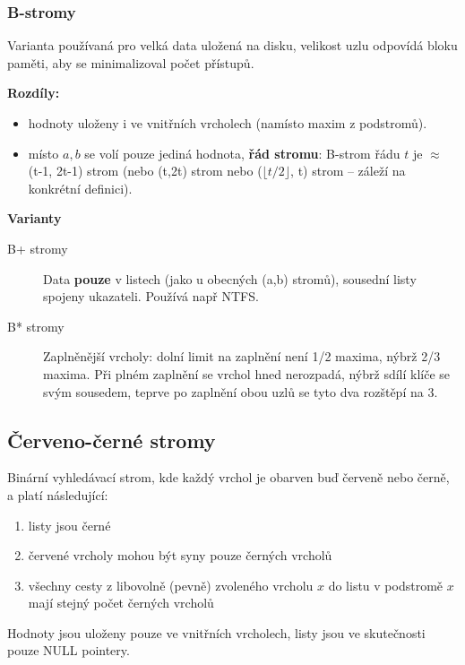 \documentclass[11pt]{report} %
\numberwithin{equation}{section}
\begin{document}
\subsubsection{B-stromy}
Varianta používaná pro velká data uložená na disku, velikost uzlu odpovídá bloku paměti, aby se minimalizoval počet přístupů.

\textbf{Rozdíly: }
\begin{itemize}
	
	
	\item hodnoty uloženy i ve vnitřních vrcholech (namísto maxim z podstromů). 
	\item místo $a,b$ se volí pouze jediná hodnota, \textbf{řád stromu}: B-strom řádu $t$ je $\approx$ (t-1, 2t-1) strom (nebo (t,2t) strom nebo ($\lfloor t/2\rfloor$, t) strom -- záleží na konkrétní definici).
\end{itemize}

\textbf{Varianty}
\begin{description}
	
	
	\item[B+ stromy] Data \textbf{pouze} v listech (jako u obecných (a,b) stromů), sousední listy spojeny ukazateli. Používá např NTFS.
	
	\item[B* stromy] Zaplněnější vrcholy: dolní limit na zaplnění není 1/2 maxima, nýbrž 2/3 maxima. Při plném zaplnění se vrchol hned nerozpadá, nýbrž sdílí klíče se svým sousedem, teprve po zaplnění obou uzlů se tyto dva rozštěpí na 3.
\end{description}

\subsection{Červeno-černé stromy}
Binární vyhledávací strom, kde každý vrchol je obarven buď červeně nebo černě, a platí následující:
\begin{enumerate}
		
	
	\item listy jsou černé
	\item červené vrcholy mohou být syny pouze černých vrcholů
	\item všechny cesty z libovolně (pevně) zvoleného vrcholu $x$ do listu v podstromě $x$ mají stejný počet černých vrcholů
\end{enumerate}

Hodnoty jsou uloženy pouze ve vnitřních vrcholech, listy jsou ve skutečnosti pouze NULL pointery.
\end{document}
